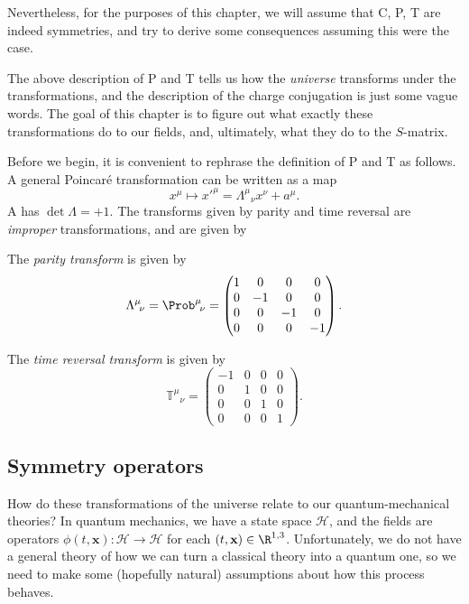 \documentclass[a4paper]{article}
\begin{document}
Nevertheless, for the purposes of this chapter, we will assume that C, P, T are indeed symmetries, and try to derive some consequences assuming this were the case.

The above description of P and T tells us how the \emph{universe} transforms under the transformations, and the description of the charge conjugation is just some vague words. The goal of this chapter is to figure out what exactly these transformations do to our fields, and, ultimately, what they do to the $S$-matrix.

Before we begin, it is convenient to rephrase the definition of P and T as follows. A general Poincar\'e transformation can be written as a map
\[
  x^\mu \mapsto x'^\mu = \Lambda^\mu\!_\nu x^\nu + a^\mu.
\]
A  has $\det \Lambda = +1$. The transforms given by parity and time reversal are \emph{improper} transformations, and are given by
\begin{defi}
  The \emph{parity transform} is given by
  \[
    \Lambda^\mu\!_\nu = \Prob^\mu\!_\nu =
    \begin{pmatrix}
      1 & 0 & 0 & 0\\
      0 & -1 & 0 & 0\\
      0 & 0 & -1 & 0\\
      0 & 0 & 0 & -1
    \end{pmatrix}.
  \]
\end{defi}


\begin{defi}
  The \emph{time reversal transform} is given by
  \[
    \mathbb{T}^\mu\!_\nu =
    \begin{pmatrix}
      -1 & 0 & 0 & 0\\
      0 & 1 & 0 & 0\\
      0 & 0 & 1 & 0\\
      0 & 0 & 0 & 1
    \end{pmatrix}.
  \]
\end{defi}

\subsection{Symmetry operators}
How do these transformations of the universe relate to our quantum-mechanical theories? In quantum mechanics, we have a state space $\mathcal{H}$, and the fields are operators $\phi(t, \mathbf{x}): \mathcal{H} \to \mathcal{H}$ for each $(t, \mathbf{x}) \in \R^{1, 3}$. Unfortunately, we do not have a general theory of how we can turn a classical theory into a quantum one, so we need to make some (hopefully natural) assumptions about how this process behaves.
\end{document}
